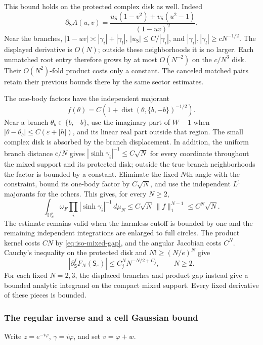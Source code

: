 \documentclass[11pt]{article}
\numberwithin{equation}{section}
\theoremstyle{definition}
\newcommand{\eps}{\varepsilon}
\begin{document}
This bound holds on the protected complex disk as well.  Indeed
\[
 \partial_{\mathsf S}A(u,v)
 =\frac{u_{\mathsf S}(1-v^2)+v_{\mathsf S}(u^2-1)}{(1-uv)^2}.
\]
Near the branches, $|1-uv|\asymp|\gamma_i|+|\gamma_l|$,
$|u_{\mathsf S}|\le C/|\gamma_i|$, and
$|\gamma_i|,|\gamma_l|\ge cN^{-1/2}$.  The displayed derivative
is $O(N)$; outside these neighborhoods it is no larger.
Each unmatched root entry therefore grows by at most $O(N^{-2})$
on the $c/N^3$ disk.  Their $O(N^2)$-fold product costs only a
constant.  The canceled matched pairs retain their previous bounds
there by the same sector estimates.

The one-body factors have the independent majorant
\[
 f(\theta)=C\left(1+
       \operatorname{dist}(\theta,\{b,-b\})^{-1/2}\right).
\]
Near a branch $\theta_b\in\{b,-b\}$, use the imaginary part of
$W-1$ when $|\theta-\theta_b|\le C(\eps+|h|)$, and its linear
real part outside that region.  The small
complex disk is absorbed by the branch displacement.  In addition,
the uniform branch distance $c/N$ gives
$|\sinh\gamma_i|^{-1}\le C\sqrt N$ for every coordinate throughout
the mixed support and its protected disk; outside the true branch
neighborhoods the factor is bounded by a constant.  Eliminate the
fixed $N$th angle with the constraint, bound its one-body factor by
$C\sqrt N$, and use the independent $L^1$ majorants for the others.
This gives, for every $N\ge2$,
\[
 \int_{\mathbb H_N^\sigma}\omega_F
       \prod_i|\sinh\gamma_i|^{-1}\,d\mu_N
       \le C\sqrt N\,\|f\|_1^{N-1}\le C^N\sqrt N .
\]
The estimate remains valid when the harmless cutoff is bounded by one
and the remaining independent integrations are enlarged to full circles.
The product kernel costs
$CN$ by \eqref{eq:iso-mixed-gap}, and the angular Jacobian costs
$C^N$.  Cauchy's inequality on the protected disk and $N!\ge(N/e)^N$
give
\begin{equation}\label{eq:iso-mixed-jets}
 |\partial_{\mathsf S}^j F_N(\mathsf S_\eps)|
       \le C_j^N N^{-N/2+C_j},\qquad N\ge2.
\end{equation}
For each fixed $N=2,3$, the displaced branches and product gap instead
give a bounded analytic integrand on the compact mixed support.
Every fixed derivative of these pieces is bounded.

\subsubsection{The regular inverse and a cell Gaussian bound}

Write $z=e^{-i\varphi}$, $\gamma=i\varphi$, and set $v=\varphi+w$.
\end{document}
